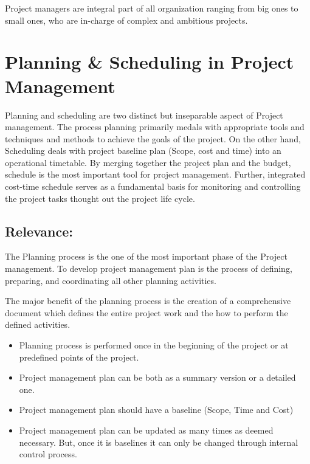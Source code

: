 Project managers are integral part of all organization ranging from big ones to small ones, who are in-charge of complex and ambitious projects.

 \section{Planning \& Scheduling in Project Management}
 \label{sec:sec002}
 
 
 Planning and scheduling are two distinct but inseparable aspect of Project management\cite{Moylan}. The process planning primarily medals with appropriate tools and techniques and methods to achieve the goals of the project. On the other hand, Scheduling deals with project baseline plan (Scope, cost and time) into an operational timetable. By merging together the project plan and the budget, schedule is the most important tool for project management. Further, integrated cost-time schedule serves as a fundamental basis for monitoring and controlling the project tasks thought out the project life cycle.
 
 \subsection{Relevance:}
 
 The Planning process is the one of the most important phase of the Project management. To develop project management plan is the process of defining, preparing, and coordinating all other planning activities.
 
 The major benefit of the planning process is the creation of a comprehensive document which defines the entire project work and the how to perform the defined activities.
 
 \begin{itemize}
 	\item Planning process is performed once in the beginning of the project or at predefined points of the project.
 	\item  Project management plan can be both as a summary version or a detailed one.
 	\item Project management plan should have  a baseline (Scope, Time and Cost)
 	\item Project management plan can be updated as many times as deemed necessary. But, once it is baselines it can only be changed through internal control process.
 \end{itemize}
 
